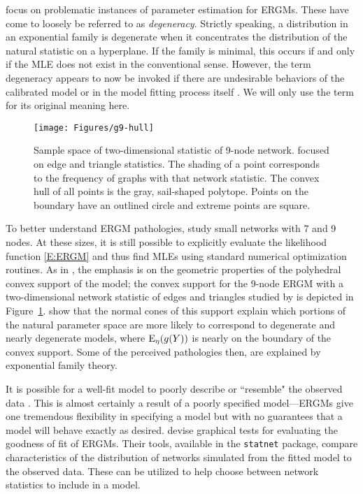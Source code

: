 \citet*{Handcock:degeneracy, Rinaldo:2009} focus on problematic instances of parameter 
estimation for ERGMs.  These have come to loosely be referred 
to as \emph{degeneracy}.  Strictly speaking, a distribution in an exponential
family is degenerate when it concentrates the distribution of the natural statistic
on a hyperplane.  If the family is minimal, this occurs if and only if the MLE does not
exist in the conventional sense.  However, the term degeneracy
appears to now be invoked if there are undesirable behaviors of the calibrated model or 
in the model fitting process itself
\citep{Handcock:degeneracy,advancesp*,recentp*,statnet-tutorial}.
We will only use the term for its original meaning here.   

\begin{figure}[h]
\centering
\texttt{[image: Figures/g9-hull]}
\caption[Sample space of two-dimensional statistic of 9-node network]{Sample space 
of two-dimensional statistic of 9-node network.  \citet{Rinaldo:2009} focused
on edge and triangle statistics.  The shading of a point corresponds to 
the frequency of graphs with that network statistic.  
The convex hull of all points is the gray, sail-shaped polytope.  Points on the 
boundary have an outlined circle and extreme points are square.}
\label{F:g9-hull}
\end{figure}

To better understand ERGM pathologies, \citeauthor{Handcock:degeneracy,Rinaldo:2009}
study small networks with 7 and 9 nodes.  At these sizes, it is still 
possible to explicitly evaluate the likelihood function \eqref{E:ERGM} and thus 
find MLEs using standard numerical optimization routines.  
As in \citep{Geyer:gdor}, the emphasis is on the geometric properties of the 
polyhedral convex support of the model;
the convex support for the 9-node ERGM with a two-dimensional network statistic of
edges and triangles
studied by \citeauthor{Rinaldo:2009} is depicted in Figure~\ref{F:g9-hull}.
\citeauthor{Rinaldo:2009} show that the normal cones of this support
explain which portions of the natural parameter space are more likely to correspond to 
degenerate and nearly degenerate models, where $\operatorname{E}_\eta(g(Y))$ is nearly 
on the boundary of the convex support.  Some of the perceived pathologies then, 
are explained by exponential family theory.

It is possible for a well-fit model to poorly describe or ``resemble" the observed data 
\citep{ergm}.
This is almost certainly a result of a poorly specified model---ERGMs give one tremendous
flexibility in specifying a model but with no guarantees that a model will behave exactly as 
desired.  \citet*{GOF} devise graphical tests for evaluating the goodness of fit of ERGMs.
Their tools, available in the \texttt{statnet} package, compare characteristics of 
the distribution of networks simulated from the fitted model to the observed data.
These can be utilized to help choose between network statistics to include in a 
model. 

